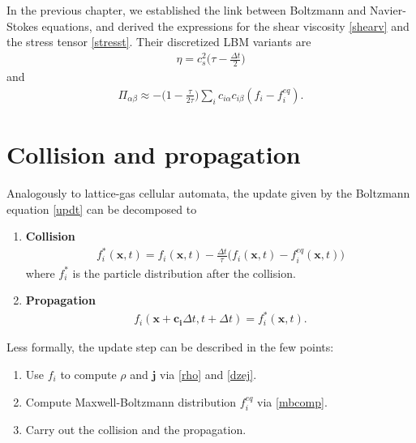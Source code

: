 \bigskip

In the previous chapter, we established the link between Boltzmann and Navier-Stokes equations, and derived the expressions for the shear viscosity \ref{shearv} and the stress tensor \ref{stresst}. Their discretized LBM variants are
\begin{align*}
\eta = c_s^2 \big( \tau - \frac{\Delta t}{2} \big)
\end{align*}
and
\begin{align*}
\Pi_{\alpha \beta} \approx - \big( 1 - \frac{\tau}{2 \tau} \big) \sum_i c_{i\alpha} c_{i\beta}(f_i - f_i^{eq}).
\end{align*}

\section{Collision and propagation}
Analogously to lattice-gas cellular automata, the update given by the Boltzmann equation \ref{updt} can be decomposed to
\begin{enumerate}
\item \textbf{Collision}
\begin{align}
f_i^*(\bm{x},t) = f_i(\bm{x},t) - \frac{\Delta t}{\tau}\big( f_i(\bm{x},t) - f_i^{eq}(\bm{x},t) \big)
\end{align}
where $f_i^*$ is the particle distribution after the collision.
\item \textbf{Propagation}
\begin{align*}
f_i(\bm{x} + \bm{c_i} \Delta t, t + \Delta t) = f_i^*(\bm{x},t).
\end{align*}
\end{enumerate}

Less formally, the update step can be described in the few points:
\begin{enumerate}
\item Use $f_i$ to compute $\rho$ and $\bm{j}$ via \ref{rho} and \ref{dzej}.
\item Compute Maxwell-Boltzmann distribution $f_i^{eq}$ via \ref{mbcomp}.
\item Carry out the collision and the propagation.
\end{enumerate}

